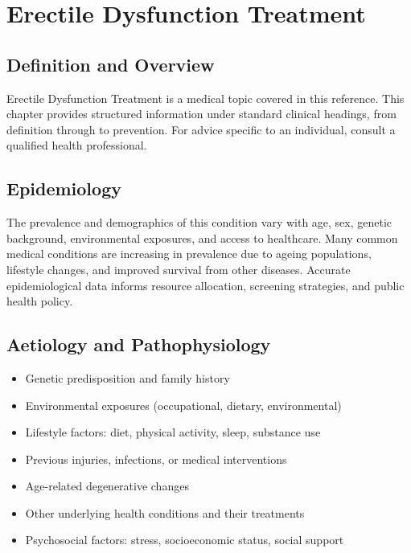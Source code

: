 \chapter{Erectile Dysfunction Treatment}

\section*{Definition and Overview}
Erectile Dysfunction Treatment is a medical topic covered in this reference. This chapter provides structured information under standard clinical headings, from definition through to prevention. For advice specific to an individual, consult a qualified health professional.

\section*{Epidemiology}
The prevalence and demographics of this condition vary with age, sex, genetic background, environmental exposures, and access to healthcare. Many common medical conditions are increasing in prevalence due to ageing populations, lifestyle changes, and improved survival from other diseases. Accurate epidemiological data informs resource allocation, screening strategies, and public health policy.

\section*{Aetiology and Pathophysiology}
\begin{itemize}
    \item Genetic predisposition and family history
    \item Environmental exposures (occupational, dietary, environmental)
    \item Lifestyle factors: diet, physical activity, sleep, substance use
    \item Previous injuries, infections, or medical interventions
    \item Age-related degenerative changes
    \item Other underlying health conditions and their treatments
    \item Psychosocial factors: stress, socioeconomic status, social support
\end{itemize}

